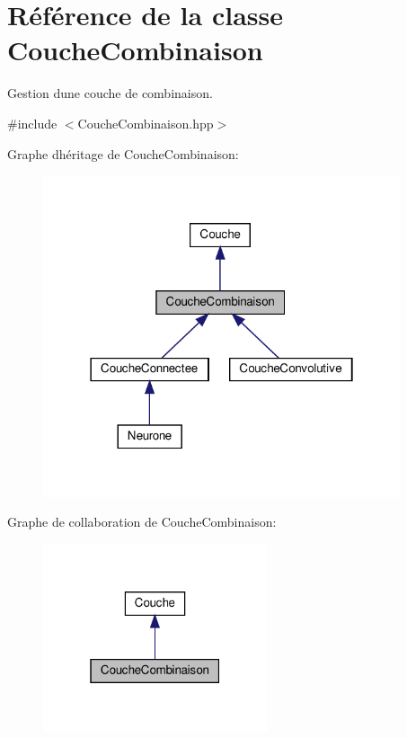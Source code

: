 \hypertarget{class_couche_combinaison}{}\section{Référence de la classe Couche\+Combinaison}
\label{class_couche_combinaison}


Gestion d\textquotesingle{}une couche de combinaison.  




{\ttfamily \#include $<$Couche\+Combinaison.\+hpp$>$}



Graphe d\textquotesingle{}héritage de Couche\+Combinaison\+:\nopagebreak
\begin{figure}[H]
\begin{center}
\leavevmode
\includegraphics[width=298pt]{class_couche_combinaison__inherit__graph}
\end{center}
\end{figure}


Graphe de collaboration de Couche\+Combinaison\+:\nopagebreak
\begin{figure}[H]
\begin{center}
\leavevmode
\includegraphics[width=187pt]{class_couche_combinaison__coll__graph}
\end{center}
\end{figure}
